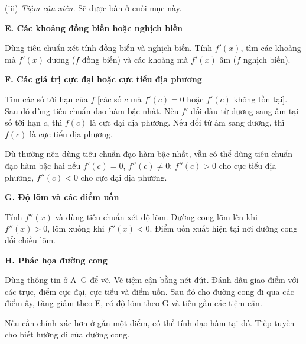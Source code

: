 \documentclass[12pt,a4paper]{article}
\newcommand{\group}[1]{\par\medskip\noindent\textbf{#1}\par\nopagebreak[4]}
\begin{document}
(iii) \textit{Tiệm cận xiên.} Sẽ được bàn ở cuối mục này.
\group{E. Các khoảng đồng biến hoặc nghịch biến}
Dùng tiêu chuẩn xét tính đồng biến và nghịch biến. Tính $f'(x)$, tìm các khoảng mà $f'(x)$ dương ($f$ đồng biến) và các khoảng mà $f'(x)$ âm ($f$ nghịch biến).
\group{F. Các giá trị cực đại hoặc cực tiểu địa phương}
Tìm các số tới hạn của $f$ [các số $c$ mà $f'(c)=0$ hoặc $f'(c)$ không tồn tại]. Sau đó dùng tiêu chuẩn đạo hàm bậc nhất. Nếu $f'$ đổi dấu từ dương sang âm tại số tới hạn $c$, thì $f(c)$ là cực đại địa phương. Nếu đổi từ âm sang dương, thì $f(c)$ là cực tiểu địa phương.

Dù thường nên dùng tiêu chuẩn đạo hàm bậc nhất, vẫn có thể dùng tiêu chuẩn đạo hàm bậc hai nếu $f'(c)=0$, $f''(c)\ne0$: $f''(c)>0$ cho cực tiểu địa phương, $f''(c)<0$ cho cực đại địa phương.
\group{G. Độ lõm và các điểm uốn}
Tính $f''(x)$ và dùng tiêu chuẩn xét độ lõm. Đường cong lõm lên khi $f''(x)>0$, lõm xuống khi $f''(x)<0$. Điểm uốn xuất hiện tại nơi đường cong đổi chiều lõm.
\group{H. Phác họa đường cong}
Dùng thông tin ở A–G để vẽ. Vẽ tiệm cận bằng nét đứt. Đánh dấu giao điểm với các trục, điểm cực đại, cực tiểu và điểm uốn. Sau đó cho đường cong đi qua các điểm ấy, tăng giảm theo E, có độ lõm theo G và tiến gần các tiệm cận.

Nếu cần chính xác hơn ở gần một điểm, có thể tính đạo hàm tại đó. Tiếp tuyến cho biết hướng đi của đường cong.
\end{document}
